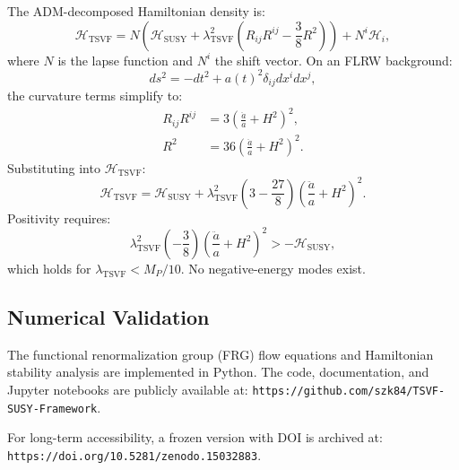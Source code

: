\documentclass[twocolumn,superscriptaddress,floatfix]{revtex4-2}
\begin{document}
The ADM-decomposed Hamiltonian density is:
\begin{equation}
\mathcal{H}_{\text{TSVF}} = N\left(\mathcal{H}_{\text{SUSY}} + \lambda_{\text{TSVF}}^2\left(R_{ij}R^{ij} - \frac{3}{8}R^2\right)\right) + N^i\mathcal{H}_i,
\end{equation}
where \(N\) is the lapse function and \(N^i\) the shift vector. On an FLRW background:
\begin{equation}
ds^2 = -dt^2 + a(t)^2\delta_{ij}dx^i dx^j,
\end{equation}
the curvature terms simplify to:
\begin{align}
R_{ij}R^{ij} &= 3\left(\frac{\ddot{a}}{a} + H^2\right)^2, \\
R^2 &= 36\left(\frac{\ddot{a}}{a} + H^2\right)^2.
\end{align}
Substituting into \(\mathcal{H}_{\text{TSVF}}\):
\begin{equation}
\mathcal{H}_{\text{TSVF}} = \mathcal{H}_{\text{SUSY}} + \lambda_{\text{TSVF}}^2\left(3 - \frac{27}{8}\right)\left(\frac{\ddot{a}}{a} + H^2\right)^2.
\end{equation}
Positivity requires:
\begin{equation}
\lambda_{\text{TSVF}}^2\left(-\frac{3}{8}\right)\left(\frac{\ddot{a}}{a} + H^2\right)^2 > -\mathcal{H}_{\text{SUSY}},
\end{equation}
which holds for \(\lambda_{\text{TSVF}} < M_P/10\). No negative-energy modes exist.


\subsection{Numerical Validation}
\label{app:numerics}

The functional renormalization group (FRG) flow equations and Hamiltonian stability analysis are implemented in Python. The code, documentation, and Jupyter notebooks are publicly available at:  
\texttt{https://github.com/szk84/TSVF-SUSY-Framework}.  

For long-term accessibility, a frozen version with DOI is archived at:  
\texttt{https://doi.org/10.5281/zenodo.15032883}.



\end{document}
